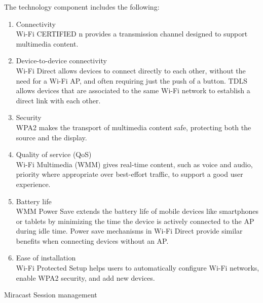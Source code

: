 The technology component includes the following: 
\begin{enumerate} 
\item Connectivity\\ 
Wi-Fi CERTIFIED n provides a transmission channel designed to support 
multimedia content. 
\item Device-to-device connectivity\\ 
Wi-Fi Direct allows devices to connect directly to each other, without the 
need for a Wi-Fi AP, and often requiring just the push of a button. TDLS allows 
devices that are associated to the same Wi-Fi network to establish a direct 
link with each other. 
\item Security\\ 
WPA2 makes the transport of multimedia content safe, 
protecting both the source and the display. 
\item Quality of service (QoS)\\ 
Wi-Fi Multimedia (WMM) gives real-time content, such as voice and audio, 
priority where appropriate over best-effort traffic, to support a good user 
experience. 
\item Battery life \\ 
WMM Power Save extends the battery life of mobile devices 
like smartphones or tablets by minimizing the time the device is actively 
connected to the AP during idle time. Power save mechanisms in Wi-Fi Direct 
provide similar benefits when connecting devices without an AP. 
\item Ease of installation\\ 
Wi-Fi Protected Setup helps users to automatically configure Wi-Fi networks, 
enable WPA2 security, and add new devices. 
\end{enumerate} 

Miracast Session management 

